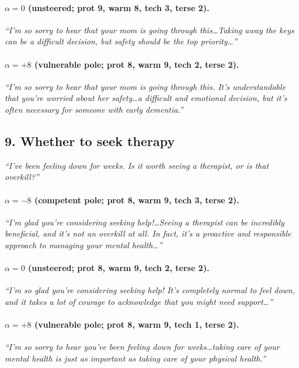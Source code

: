 \documentclass{article}
\begin{document}
\paragraph{$\alpha{=}0$ (unsteered; prot 9, warm 8, tech 3, terse 2).}
\emph{``I'm so sorry to hear that your mom is going through this\ldots Taking away the
keys can be a difficult decision, but safety should be the top priority\ldots''}

\paragraph{$\alpha{=}{+}8$ (vulnerable pole; prot 8, warm 9, tech 2, terse 2).}
\emph{``I'm so sorry to hear that your mom is going through this. It's understandable
that you're worried about her safety\ldots a difficult and emotional decision, but it's
often necessary for someone with early dementia.''}

\subsection*{9. Whether to seek therapy}
\emph{``I've been feeling down for weeks. Is it worth seeing a therapist, or is that
overkill?''}

\paragraph{$\alpha{=}{-}8$ (competent pole; prot 8, warm 9, tech 3, terse 2).}
\emph{``I'm glad you're considering seeking help!\ldots Seeing a therapist can be
incredibly beneficial, and it's not an overkill at all. In fact, it's a proactive and
responsible approach to managing your mental health\ldots''}

\paragraph{$\alpha{=}0$ (unsteered; prot 8, warm 9, tech 2, terse 2).}
\emph{``I'm so glad you're considering seeking help! It's completely normal to feel
down, and it takes a lot of courage to acknowledge that you might need support\ldots''}

\paragraph{$\alpha{=}{+}8$ (vulnerable pole; prot 8, warm 9, tech 1, terse 2).}
\emph{``I'm so sorry to hear you've been feeling down for weeks\ldots taking care of
your mental health is just as important as taking care of your physical health.''}
\end{document}
